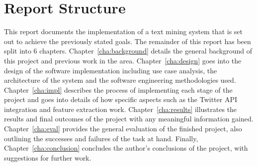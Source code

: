 \section{Report Structure}
This report documents the implementation of a text mining system that is set out to achieve the previously stated goals. The remainder of this report has been split into 6 chapters.
Chapter~\ref{cha:background} details the general background of this project and previous work in the area.
Chapter~\ref{cha:design} goes into the design of the software implementation including use case analysis, the architecture of the system and the software engineering methodologies used.
Chapter~\ref{cha:impl} describes the process of implementing each stage of the project and goes into details of how specific aspects such as the Twitter API integration and feature extraction work.
Chapter~\ref{cha:results} illustrates the results and final outcomes of the project with any meaningful information gained.
Chapter~\ref{cha:eval} provides the general evaluation of the finished project, also outlining the successes and failures of the task at hand.
Finally, Chapter~\ref{cha:conclusion} concludes the author's conclusions of the project, with suggestions for further work.

